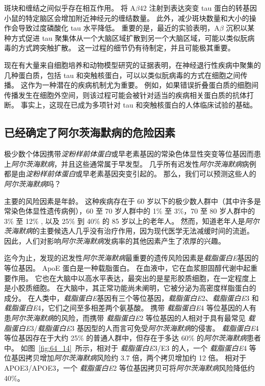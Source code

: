 斑块和缠结之间似乎存在相互作用。
将 A$\beta$42 注射到表达突变 tau 蛋白的转基因小鼠的特定脑区会增加附近神经元的缠结数量。
此外，减少斑块数量和大小的操作会导致过度磷酸化 tau 水平降低。
重要的是，最近的实验表明，A$\beta$ 沉积以某种方式促进 tau 聚集体从一个大脑区域扩散到另一个大脑区域，可能以类似朊病毒的方式跨突触扩散。
这一过程的细节仍有待制定，并且可能极其重要。


现在有大量来自细胞培养和动物模型研究的证据表明，在神经退行性疾病中聚集的几种蛋白质，包括 tau 和突触核蛋白，可以以类似朊病毒的方式在细胞之间传播。
这作为一种潜在的疾病机制尤为重要。
例如，如果错误折叠蛋白质的细胞间传播发生在细胞外空间，则该过程可能会被针对适当的疾病相关蛋白质的抗体打断。
事实上，这现在已成为多项针对 tau 和突触核蛋白的人体临床试验的基础。



\subsection{已经确定了阿尔茨海默病的危险因素}

极少数个体因携带\textit{淀粉样前体蛋白}或早老素基因的常染色体显性突变等位基因而患上\textit{阿尔茨海默病}，并且这些通常属于早发型。
几乎所有迟发性\textit{阿尔茨海默病}病例都是由\textit{淀粉样前体蛋白}或早老素基因突变引起的。
那么，我们可以预测这些人的\textit{阿尔茨海默病}吗？


主要的风险因素是年龄。
这种疾病存在于 60 岁以下的极少数人群中（其中许多是常染色体显性遗传病例），60 至 70 岁人群中的 1\% 至 3\%，70 至 80 岁人群中的 3\% 至 12\% , 以及 25\% 到 40\% 的 85 岁以上的老年人。
然而，知道老年人是\textit{阿尔茨海默病}的主要候选人几乎没有治疗作用，因为现代医学无法减缓时间的流逝。
因此，人们对影响\textit{阿尔茨海默病}发病率的其他因素产生了浓厚的兴趣。


迄今为止，发现的迟发性\textit{阿尔茨海默病}最重要的遗传风险因素是\textit{载脂蛋白E}基因的等位基因。
ApoE 蛋白是一种载脂蛋白。
在血液中，它在血浆胆固醇代谢中起重要作用。
它也在大脑中以高水平表达，最突出的是星形胶质细胞，在一定程度上是小胶质细胞。
在大脑中，其正常功能尚未阐明，它被分泌为高密度样脂蛋白的成分。
在人类中，\textit{载脂蛋白E}基因有三个等位基因，\textit{载脂蛋白E}2、\textit{载脂蛋白E}3 和 \textit{载脂蛋白E}4，它们之间至多相差两个氨基酸。
携带 \textit{载脂蛋白E}4 等位基因的人有患\textit{阿尔茨海默病}的风险，而携带 \textit{载脂蛋白E}2 等位基因的人相对于具有最常见 \textit{载脂蛋白E}3/\textit{载脂蛋白E}3 基因型的人而言可免受\textit{阿尔茨海默病}的侵害。
\textit{载脂蛋白E}4 等位基因存在于大约 25\% 的普通人群中，但存在于多达 60\% 的\textit{阿尔茨海默病}患者中。
如图~\ref{fig:64_14}~所示，相对于 \textit{载脂蛋白E}3/E3 的人，一个 \textit{载脂蛋白E}4 等位基因拷贝增加\textit{阿尔茨海默病}风险约 3.7 倍，两个拷贝增加约 12 倍。
相对于 APOE3/APOE3，一个 \textit{载脂蛋白E}2 等位基因拷贝可将\textit{阿尔茨海默病}风险降低约 40\%。


